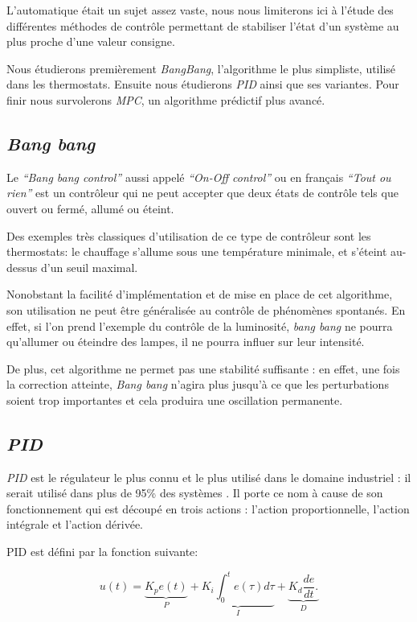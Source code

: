 \documentclass[a4paper,10pt]{report}
\begin{document}
L'automatique était un sujet assez vaste, nous nous limiterons ici à l'étude des différentes méthodes de contrôle permettant de stabiliser l'état d'un système au plus proche d'une valeur consigne.

Nous étudierons premièrement \emph{BangBang}, l'algorithme le plus simpliste, utilisé dans les thermostats.
Ensuite nous étudierons \emph{PID} ainsi que ses variantes.
Pour finir nous survolerons \emph{MPC}, un algorithme prédictif plus avancé.

\subsection{\emph{Bang bang}}
Le \emph{``Bang bang control''} aussi appelé \emph{``On-Off control''} ou en français \emph{``Tout ou rien''} est un contrôleur qui ne peut accepter que deux états de contrôle tels que ouvert ou fermé, allumé ou éteint.

Des exemples très classiques d'utilisation de ce type de contrôleur sont les thermostats: le chauffage s'allume sous une température minimale, et s'éteint au-dessus d'un seuil maximal.

Nonobstant la facilité d'implémentation et de mise en place de cet algorithme, son utilisation ne peut être généralisée au contrôle de phénomènes spontanés. En effet, si l'on prend l'exemple du contrôle de la luminosité, \emph{bang bang} ne pourra qu'allumer ou éteindre des lampes, il ne pourra influer sur leur intensité. \cite{Burghes2004}

De plus, cet algorithme ne permet pas une stabilité suffisante : en effet, une fois la correction atteinte, \emph{Bang bang} n'agira plus jusqu'à ce que les perturbations soient trop importantes et cela produira une oscillation permanente. \cite{ballard1993pid}


\subsection{\emph{PID}}
\label{PID}

\emph{PID} est le régulateur le plus connu et le plus utilisé dans le domaine industriel : il serait utilisé dans plus de 95\% des systèmes \cite{Kinnaert2013, aastrom2002control}.
Il porte ce nom à cause de son fonctionnement qui est découpé en trois actions : l'action proportionnelle, l'action intégrale et l'action dérivée.

PID est défini par la fonction suivante:

\begin{equation}
  u(t) =
    \underbrace{K_p e(t)}_{P} +
    \underbrace{K_i \int_{0}^{t} e(\tau) d\tau}_{I} +
    \underbrace{K_d \frac{de}{dt}.}_{D}
\end{equation}
\end{document}
